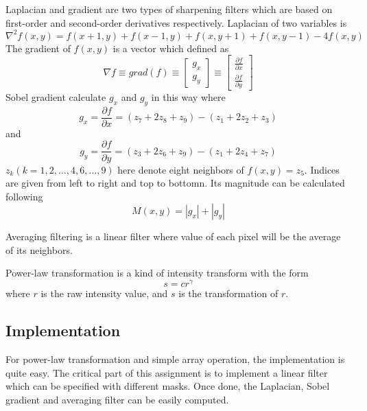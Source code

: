 \documentclass[11pt,a4paper]{article}
\begin{document}
Laplacian and gradient are two types of sharpening filters which are based on first-order and second-order
derivatives respectively. Laplacian of two variables is
\begin{equation}
	\nabla^2 f(x,y)=f(x+1,y)+f(x-1,y)+f(x,y+1)+f(x,y-1)-4f(x,y)
\end{equation}
The gradient of $f(x,y)$ is a vector which defined as 
\begin{equation}
\nabla f\equiv grad(f)\equiv\left[\begin{array}{c}g_x \\ g_y\end{array}\right]
	\equiv\left[\begin{array}{c}
		\frac{\partial f}{\partial x} \\ 
		\frac{\partial f}{\partial y}
	\end{array}	\right]
\end{equation}
Sobel gradient calculate $g_x$ and $g_y$ in this way where
\begin{equation}
	g_x=\frac{\partial f}{\partial x}=(z_7+2z_8+z_9)-(z_1+2z_2+z_3)
\end{equation}
and
\begin{equation}
	g_y=\frac{\partial f}{\partial y}=(z_3+2z_6+z_9)-(z_1+2z_4+z_7)
\end{equation}
$z_k(k=1,2,\dots,4,6,\dots,9)$ here denote eight neighbors of $f(x,y)=z_5$. Indices 
are given from left to right and top to bottomn. Its magnitude can be calculated following
\begin{equation}
	M(x,y)=|g_x|+|g_y|
\end{equation}

Averaging filtering is a linear filter where value of each pixel will be the average of its neighbors.

Power-law transformation is a kind of intensity transform with the form
\begin{equation}
	s=cr^{\gamma}
\end{equation}
where $r$ is the raw intensity value, and $s$ is the transformation of $r$.

\subsection{Implementation}
For power-law transformation and simple array operation, the implementation is 
quite easy. The critical part of this assignment is to implement a linear filter
which can be specified with different masks. Once done, the Laplacian, Sobel gradient
and averaging filter can be easily computed.
\end{document}

